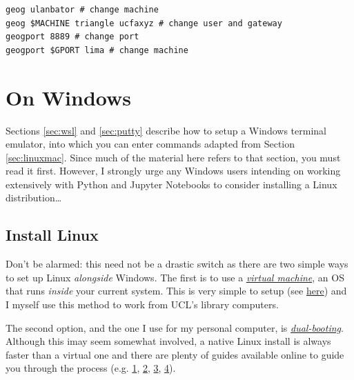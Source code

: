 \documentclass[a4paper]{article}
\begin{document}
\begin{lstlisting}[caption={Examples of arguments to geography login/tunnel functions}, label={lst:gfuncsargseg}]
geog ulanbator # change machine
geog $MACHINE triangle ucfaxyz # change user and gateway
geogport 8889 # change port
geogport $GPORT lima # change machine
\end{lstlisting}

\section{On Windows}
\label{sec:windows}

Sections \ref{sec:wsl} and \ref{sec:putty} describe how to setup a Windows terminal emulator, into which you can enter commands adapted from Section \ref{sec:linuxmac}.
Since much of the material here refers to that section, you must read it first.
However, I strongly urge any Windows users intending on working extensively with Python and Jupyter Notebooks to consider installing a Linux distribution\ldots

\subsection{Install Linux}
\label{sec:win2lnx}
Don't be alarmed: this need not be a drastic switch as there are two simple ways to set up Linux \emph{alongside} Windows.
The first is to use a \emph{\href{https://www.howtogeek.com/196060/beginner-geek-how-to-create-and-use-virtual-machines/}{virtual machine}}, an OS that runs \emph{inside} your current system.
This is very simple to setup (see \href{http://www.storagecraft.com/blog/the-dead-simple-guide-to-installing-a-linux-virtual-machine-on-windows/}{here}) and I myself use this method to work from UCL's library computers.

The second option, and the one I use for my personal computer, is \emph{\href{https://www.howtogeek.com/187789/dual-booting-explained-how-you-can-have-multiple-operating-systems-on-your-computer/}{dual-booting}}.
Although this imay seem somewhat involved, a native Linux install is always faster than a virtual one and there are plenty of guides available online to guide you through the process (e.g. \href{https://itsfoss.com/guide-install-linux-mint-16-dual-boot-windows/}{1}, \href{https://www.lifewire.com/ultimate-windows-7-ubuntu-linux-dual-boot-guide-2200.53}{2}, \href{https://www.howtogeek.com/214571/how-to-dual-boot-linux-on-your-pc/}{3}, \href{http://www.pcworld.com/article/2955460/operating-systems/dual-booting-linux-with-windows-what-you-need-to-know.html}{4}). 
\end{document}
